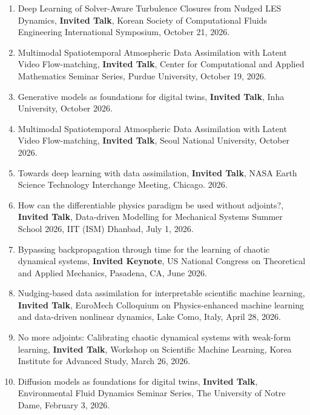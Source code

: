 \documentclass[letterpaper]{article}
\begin{document}
\begin{enumerate}

\item Deep Learning of Solver-Aware Turbulence Closures from Nudged LES Dynamics, \textbf{Invited Talk}, Korean Society of Computational Fluids Engineering International Symposium, October 21, 2026.

\item Multimodal Spatiotemporal Atmospheric Data Assimilation with Latent Video Flow-matching, \textbf{Invited Talk}, Center for Computational and Applied Mathematics Seminar Series, Purdue University, October 19, 2026.

\item Generative models as foundations for digital twins, \textbf{Invited Talk}, Inha University, October 2026.

\item Multimodal Spatiotemporal Atmospheric Data Assimilation with Latent Video Flow-matching, \textbf{Invited Talk}, Seoul National University, October 2026.

\item Towards deep learning with data assimilation, \textbf{Invited Talk}, NASA Earth Science Technology Interchange Meeting, Chicago. 2026.

\item How can the differentiable physics paradigm be used without adjoints?, \textbf{Invited Talk}, Data-driven Modelling for Mechanical Systems Summer School 2026, IIT (ISM) Dhanbad, July 1, 2026.

\item Bypassing backpropagation through time for the learning of chaotic dynamical systems, \textbf{Invited Keynote}, US National Congress on Theoretical and Applied Mechanics, Pasadena, CA, June 2026.

\item Nudging-based data assimilation for interpretable scientific machine learning, \textbf{Invited Talk}, EuroMech Colloquium on Physics-enhanced machine learning and data-driven nonlinear dynamics, Lake Como, Italy, April 28, 2026.

\item No more adjoints: Calibrating chaotic dynamical systems with weak-form learning, \textbf{Invited Talk}, Workshop on Scientific Machine Learning, Korea Institute for Advanced Study, March 26, 2026.

\item Diffusion models as foundations for digital twins, \textbf{Invited Talk}, Environmental Fluid Dynamics Seminar Series, The University of Notre Dame, February 3, 2026.


\end{enumerate}
\end{document}
